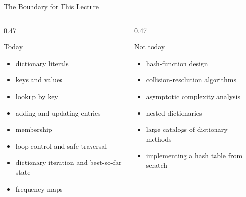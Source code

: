 \documentclass[aspectratio=169,10pt]{beamer}
\begin{document}
\begin{frame}{The Boundary for This Lecture}
  \begin{columns}[T,onlytextwidth]
    \begin{column}{0.47\textwidth}
      \begin{block}{Today}
        \begin{itemize}
          \item dictionary literals
          \item keys and values
          \item lookup by key
          \item adding and updating entries
          \item membership
          \item loop control and safe traversal
          \item dictionary iteration and best-so-far state
          \item frequency maps
        \end{itemize}
      \end{block}
    \end{column}
    \begin{column}{0.47\textwidth}
      \begin{alertblock}{Not today}
        \begin{itemize}
          \item hash-function design
          \item collision-resolution algorithms
          \item asymptotic complexity analysis
          \item nested dictionaries
          \item large catalogs of dictionary methods
          \item implementing a hash table from scratch
        \end{itemize}
      \end{alertblock}
    \end{column}
  \end{columns}
\end{frame}

\end{document}
